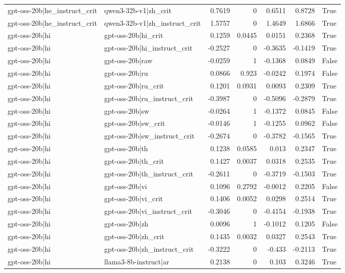 \begin{table}
\begin{tabular}{l l r r r r l}
gpt-oss-20b|he_instruct_crit & qwen3-32b-v1|zh_crit & 0.7619 & 0 & 0.6511 & 0.8728 & True \\
gpt-oss-20b|he_instruct_crit & qwen3-32b-v1|zh_instruct_crit & 1.5757 & 0 & 1.4649 & 1.6866 & True \\
gpt-oss-20b|hi & gpt-oss-20b|hi_crit & 0.1259 & 0.0445 & 0.0151 & 0.2368 & True \\
gpt-oss-20b|hi & gpt-oss-20b|hi_instruct_crit & -0.2527 & 0 & -0.3635 & -0.1419 & True \\
gpt-oss-20b|hi & gpt-oss-20b|raw & -0.0259 & 1 & -0.1368 & 0.0849 & False \\
gpt-oss-20b|hi & gpt-oss-20b|ru & 0.0866 & 0.923 & -0.0242 & 0.1974 & False \\
gpt-oss-20b|hi & gpt-oss-20b|ru_crit & 0.1201 & 0.0931 & 0.0093 & 0.2309 & True \\
gpt-oss-20b|hi & gpt-oss-20b|ru_instruct_crit & -0.3987 & 0 & -0.5096 & -0.2879 & True \\
gpt-oss-20b|hi & gpt-oss-20b|sw & -0.0264 & 1 & -0.1372 & 0.0845 & False \\
gpt-oss-20b|hi & gpt-oss-20b|sw_crit & -0.0146 & 1 & -0.1255 & 0.0962 & False \\
gpt-oss-20b|hi & gpt-oss-20b|sw_instruct_crit & -0.2674 & 0 & -0.3782 & -0.1565 & True \\
gpt-oss-20b|hi & gpt-oss-20b|th & 0.1238 & 0.0585 & 0.013 & 0.2347 & True \\
gpt-oss-20b|hi & gpt-oss-20b|th_crit & 0.1427 & 0.0037 & 0.0318 & 0.2535 & True \\
gpt-oss-20b|hi & gpt-oss-20b|th_instruct_crit & -0.2611 & 0 & -0.3719 & -0.1503 & True \\
gpt-oss-20b|hi & gpt-oss-20b|vi & 0.1096 & 0.2792 & -0.0012 & 0.2205 & False \\
gpt-oss-20b|hi & gpt-oss-20b|vi_crit & 0.1406 & 0.0052 & 0.0298 & 0.2514 & True \\
gpt-oss-20b|hi & gpt-oss-20b|vi_instruct_crit & -0.3046 & 0 & -0.4154 & -0.1938 & True \\
gpt-oss-20b|hi & gpt-oss-20b|zh & 0.0096 & 1 & -0.1012 & 0.1205 & False \\
gpt-oss-20b|hi & gpt-oss-20b|zh_crit & 0.1435 & 0.0032 & 0.0327 & 0.2543 & True \\
gpt-oss-20b|hi & gpt-oss-20b|zh_instruct_crit & -0.3222 & 0 & -0.433 & -0.2113 & True \\
gpt-oss-20b|hi & llama3-8b-instruct|ar & 0.2138 & 0 & 0.103 & 0.3246 & True \\

\end{tabular}
\end{table}
